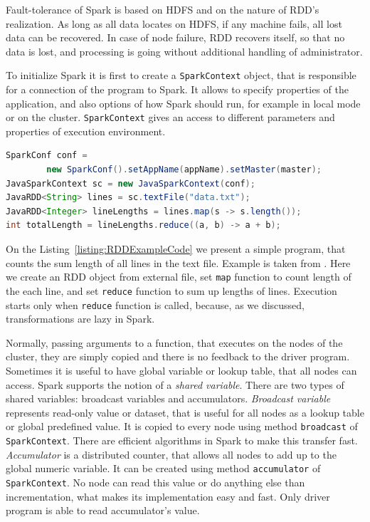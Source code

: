 Fault-tolerance of Spark is based on HDFS and on the nature of RDD's realization.
As long as all data locates on HDFS, if any machine fails, all lost data can be recovered.
In case of node failure, RDD recovers itself, so that no data is lost, and processing is going without additional handling of administrator.

To initialize Spark it is first to create a \lstinline{SparkContext} object, that is responsible for a connection of the program to Spark.
It allows to specify properties of the application, and also options of how Spark should run, for example in local mode or on the cluster.
\lstinline{SparkContext} gives an access to different parameters and properties of execution environment.

\begin{lstlisting}[float=h, caption=Counting the total length of all lines in the file using Spark's RDD object., label=listing:RDDExampleCode, language=Java]
SparkConf conf =
		new SparkConf().setAppName(appName).setMaster(master);
JavaSparkContext sc = new JavaSparkContext(conf);
JavaRDD<String> lines = sc.textFile("data.txt");
JavaRDD<Integer> lineLengths = lines.map(s -> s.length());
int totalLength = lineLengths.reduce((a, b) -> a + b);
\end{lstlisting}

On the Listing~\ref{listing:RDDExampleCode} we present a simple program, that counts the sum length of all lines in the text file.
Example is taken from \cite{Spark1}.
Here we create an RDD object from external file, set \lstinline{map} function to count length of the each line, and set \lstinline{reduce} function to sum up lengths of lines.
Execution starts only when \lstinline{reduce} function is called, because, as we discussed, transformations are lazy in Spark.

Normally, passing arguments to a function, that executes on the nodes of the cluster, they are simply copied and there is no feedback to the driver program.
Sometimes it is useful to have global variable or lookup table, that all nodes can access.
Spark supports the notion of a \textit{shared variable}.
There are two types of shared variables: broadcast variables and accumulators.
\textit{Broadcast variable}  represents read-only value or dataset, that is useful for all nodes as a lookup table or global predefined value.
It is copied to every node using method \lstinline{broadcast} of \lstinline{SparkContext}.
There are efficient algorithms in Spark to make this transfer fast.
\textit{Accumulator}  is a distributed counter, that allows all nodes to add up to the global numeric variable.
It can be created using method \lstinline{accumulator} of \lstinline{SparkContext}.
No node can read this value or do anything else than incrementation, what makes its implementation easy and fast.
Only driver program is able to read accumulator's value.

